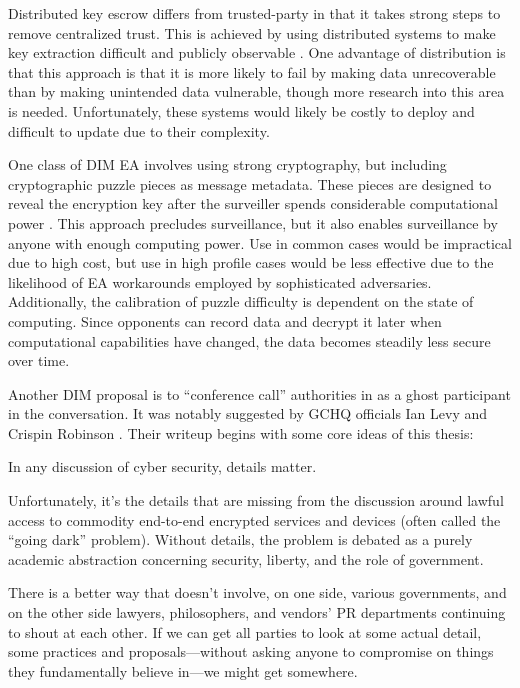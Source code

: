 Distributed key escrow differs from trusted-party in that it takes strong steps to remove centralized trust. This is
achieved by using distributed systems to make key extraction difficult and publicly observable \cite{phan_key_2017}
\cite{servan_schreiber_jje_2020}. One advantage of distribution is that this approach is that it is more likely to fail
by making data unrecoverable than by making unintended data vulnerable, though more research into this area is needed.
Unfortunately, these systems would likely be costly to deploy and difficult to update due to their complexity.

One class of \ac{DIM} \ac{EA} involves using strong cryptography, but including cryptographic puzzle pieces as message
metadata. These pieces are designed to reveal the encryption key after the surveiller spends considerable computational
power \cite{bellare_translucent_1996} \cite{wright_crypto_2018}. This approach precludes  surveillance, but it
also enables  surveillance by anyone with enough computing power. Use in common cases would be impractical
due to high cost, but use in high profile cases would be less effective due to the likelihood of \ac{EA} workarounds
employed by sophisticated adversaries. Additionally, the calibration of puzzle difficulty is dependent on the state of
computing. Since opponents can record data and decrypt it later when computational capabilities have changed, the data
becomes steadily less secure over time.

Another \ac{DIM} proposal is to ``conference call'' authorities in as a ghost participant in the conversation. It was
notably suggested by \ac{GCHQ} officials Ian Levy and Crispin Robinson \cite{levy_robinson_2018}. Their writeup begins
with some core ideas of this thesis:

\begin{displayquote}
In any discussion of cyber security, details matter.

Unfortunately, it's the details that are missing from the discussion around lawful access to commodity end-to-end
encrypted services and devices (often called the ``going dark'' problem). Without details, the problem is debated as a
purely academic abstraction concerning security, liberty, and the role of government.

There is a better way that doesn’t involve, on one side, various governments, and on the other side lawyers,
philosophers, and vendors' PR departments continuing to shout at each other. If we can get all parties to look at some
actual detail, some practices and proposals---without asking anyone to compromise on things they fundamentally believe
in---we might get somewhere.
\cite{levy_robinson_2018}
\end{displayquote}

